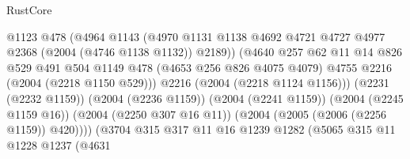 \begin{lexlean}{RustCore}
\begin{coremodule}
                                          @1123
                                          @478
                                          (@4964
                                            @1143
                                            (@4970
                                              @1131
                                              @1138
                                              @4692
                                              @4721
                                              @4727
                                              @4977
                                              @2368
                                              (@2004 (@4746 @1138 @1132))
                                              @2189))
                                          (@4640
                                            @257
                                            @62
                                            @11
                                            @14
                                            @826
                                            @529
                                            @491
                                            @504
                                            @1149
                                            @478
                                            (@4653 @256 @826 @4075 @4079)
                                            @4755
                                            @2216
                                            (@2004 (@2218 @1150 @529)))
                                          @2216
                                          (@2004 (@2218 @1124 @1156)))
                                        (@2231 (@2232 @1159))
                                        (@2004 (@2236 @1159))
                                        (@2004 (@2241 @1159))
                                        (@2004 (@2245 @1159 @16))
                                        (@2004 (@2250 @307 @16 @11))
                                        (@2004 (@2005 (@2006 (@2256 @1159)) @420))))
                                    (@3704
                                      @315
                                      @317
                                      @11
                                      @16
                                      @1239
                                      @1282
                                      (@5065
                                        @315
                                        @11
                                        @1228
                                        @1237
                                        (@4631

\end{coremodule}
\end{lexlean}
